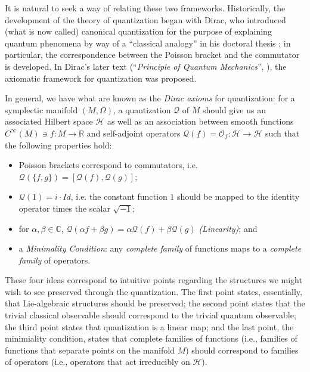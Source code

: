 It is natural to seek a way of relating these two frameworks. Historically, the development of the theory of quantization began with Dirac, who introduced (what is now called) canonical quantization for the purpose of explaining quantum phenomena by way of a ``classical analogy'' in his doctoral thesis \cite{diracthesis}; in particular, the correspondence between the Poisson bracket and the commutator is developed. In Dirac's later text (``\emph{Principle of Quantum Mechanics}'', \cite{diracprinciples}), the axiomatic framework for quantization was proposed.

In general, we have what are known as the \emph{Dirac axioms} for quantization: for a symplectic manifold $(M,\Omega)$, a quantization $\mathcal{Q}$ of $M$ should give us an associated Hilbert space $\mathcal{H}$ as well as an association between smooth functions $C^\infty(M) \ni f: M \to \mathbb{R}$ and self-adjoint operators $\mathcal{Q}(f) = \mathcal{O}_f: \mathcal{H} \to \mathcal{H}$ such that the following properties hold:
\begin{defn}
\begin{itemize}
\item Poisson brackets correspond to commutators, i.e. $\mathcal{Q}(\{f,g\}) = [\mathcal{Q}(f),\mathcal{Q}(g)]$;
\item $\mathcal{Q}(1) = i \cdot Id$, i.e. the constant function $1$ should be mapped to the identity operator times the scalar $\sqrt{-1}$;
\item for $\alpha, \beta \in \mathbb{C}$, $\mathcal{Q}(\alpha f + \beta g) = \alpha \mathcal{Q}(f) + \beta \mathcal{Q}(g)$ \emph{(Linearity)}; and
\item a \emph{Minimality Condition}: any \emph{complete family} of functions maps to a \emph{complete family} of operators.
\end{itemize}
\end{defn}

These four ideas correspond to intuitive points regarding the structures we might wish to see preserved through the quantization. The first point states, essentially, that Lie-algebraic structures should be preserved; the second point states that the trivial classical observable should correspond to the trivial quantum observable; the third point states that quantization is a linear map; and the last point, the minimiality condition, states that complete families of functions (i.e., families of functions that separate points on the manifold $M$) should correspond to families of operators (i.e., operators that act irreducibly on $\mathcal{H}$).

